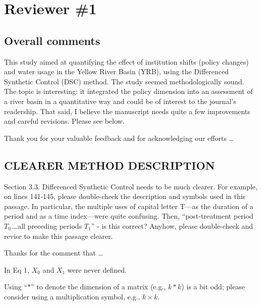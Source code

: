 \section{Reviewer \#1}\label{reviewer_1}

\subsection*{Overall comments}

\RC{} This study aimed at quantifying the effect of institution shifts (policy changes) and water usage in the Yellow River Basin (YRB), using the Differenced Synthetic Control (DSC) method. The study seemed methodologically sound. The topic is interesting: it integrated the policy dimension into an assessment of a river basin in a quantitative way and could be of interest to the journal's readership. That said, I believe the manuscript needs quite a few improvements and careful revisions. Please see below.

\AR{} Thank you for your valuable feedback and for acknowledging our efforts \dots

\subsection{CLEARER METHOD DESCRIPTION}\label{sec:1-1}

\RC{} Section 3.3. Differenced Synthetic Control needs to be much clearer. For example, on lines 141-145, please double-check the description and symbols used in this passage. In particular, the multiple uses of capital letter T—as the duration of a period and as a time index—were quite confusing. Then, ``post-treatment period $T_0$.\ldots all preceding periods $T_1$'' - is this correct? Anyhow, please double-check and revise to make this passage clearer.

\AR{} Thanks for the comment that \ldots

\RC{} In Eq 1, $X_0$ and $X_1$ were never defined.

\RC{} Using ``$*$'' to denote the dimension of a matrix (e.g., $k*k$) is a bit odd; please consider using a multiplication symbol, e.g., $k \times k$.


